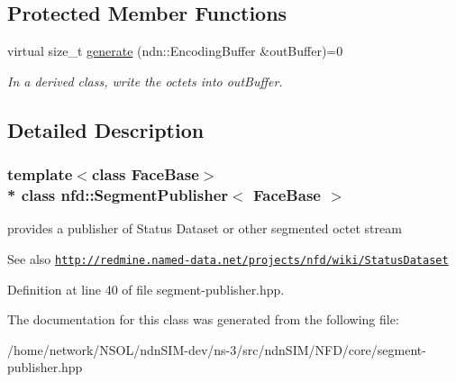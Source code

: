 \subsection*{Protected Member Functions}
\begin{DoxyCompactItemize}
\item 
virtual size\+\_\+t \hyperlink{classnfd_1_1SegmentPublisher_a7d83ea5b2b9f1aab3ee00469aca16d58}{generate} (ndn\+::\+Encoding\+Buffer \&out\+Buffer)=0\hypertarget{classnfd_1_1SegmentPublisher_a7d83ea5b2b9f1aab3ee00469aca16d58}{}\label{classnfd_1_1SegmentPublisher_a7d83ea5b2b9f1aab3ee00469aca16d58}

\begin{DoxyCompactList}\small\item\em In a derived class, write the octets into out\+Buffer. \end{DoxyCompactList}\end{DoxyCompactItemize}


\subsection{Detailed Description}
\subsubsection*{template$<$class Face\+Base$>$\\*
class nfd\+::\+Segment\+Publisher$<$ Face\+Base $>$}

provides a publisher of Status Dataset or other segmented octet stream 

\begin{DoxySeeAlso}{See also}
\href{http://redmine.named-data.net/projects/nfd/wiki/StatusDataset}{\tt http\+://redmine.\+named-\/data.\+net/projects/nfd/wiki/\+Status\+Dataset} 
\end{DoxySeeAlso}


Definition at line 40 of file segment-\/publisher.\+hpp.



The documentation for this class was generated from the following file\+:\begin{DoxyCompactItemize}
\item 
/home/network/\+N\+S\+O\+L/ndn\+S\+I\+M-\/dev/ns-\/3/src/ndn\+S\+I\+M/\+N\+F\+D/core/segment-\/publisher.\+hpp\end{DoxyCompactItemize}
